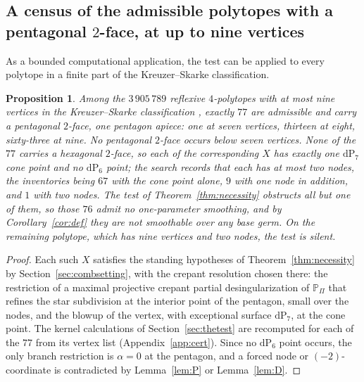 \documentclass[11pt]{amsart}
\newtheorem{proposition}[theorem]{Proposition}
\theoremstyle{definition}
\theoremstyle{remark}
\theoremstyle{plain}
\newcommand{\PP}{\mathbb{P}}
\newcommand{\dP}{\mathrm{dP}}
\begin{document}
\subsection{A census of the admissible polytopes with a pentagonal
\texorpdfstring{$2$}{2}-face, at up to nine vertices}
\label{sec:census}
As a bounded computational application, the test can be applied to every
polytope in a finite part of the Kreuzer--Skarke classification.

\begin{proposition}\label{prop:census}
Among the $3\,905\,789$ reflexive $4$-polytopes with at most nine vertices
in the Kreuzer--Skarke classification \cite{KS00}, exactly $77$ are
admissible and carry
a pentagonal $2$-face, one pentagon apiece: one at seven vertices, thirteen
at eight, sixty-three at nine.  No pentagonal $2$-face occurs below seven
vertices.  None of the $77$ carries a hexagonal $2$-face, so each of the
corresponding $X$ has exactly one $\dP_7$ cone point and no $\dP_6$ point;
the search records that each has at most two nodes, the inventories being
$67$ with the cone point alone, $9$ with one node in addition, and $1$ with
two nodes.  The test of Theorem~\ref{thm:necessity} obstructs all but one of
them, so those $76$ admit no one-parameter smoothing, and by
Corollary~\ref{cor:def} they are not smoothable over any base germ.  On the remaining polytope, which
has nine vertices and two nodes, the test is silent.
\end{proposition}

\begin{proof}
Each such $X$ satisfies the standing hypotheses of
Theorem~\ref{thm:necessity} by Section~\ref{sec:combsetting}, with the
crepant resolution chosen there: the restriction of a maximal projective
crepant partial desingularization of $\PP_{\Pi}$ that refines the star
subdivision at the interior point of the pentagon, small
over the nodes, and the blowup of the vertex, with exceptional surface
$\dP_7$, at the cone point.
The kernel calculations of Section~\ref{sec:thetest} are
recomputed for each of the $77$ from its vertex list
(Appendix~\ref{app:cert}).  Since no $\dP_6$ point occurs, the only
branch restriction is $\alpha=0$ at the pentagon, and a forced node or
$(-2)$-coordinate is contradicted by Lemma~\ref{lem:P} or
Lemma~\ref{lem:D}.
\end{proof}
\end{document}
